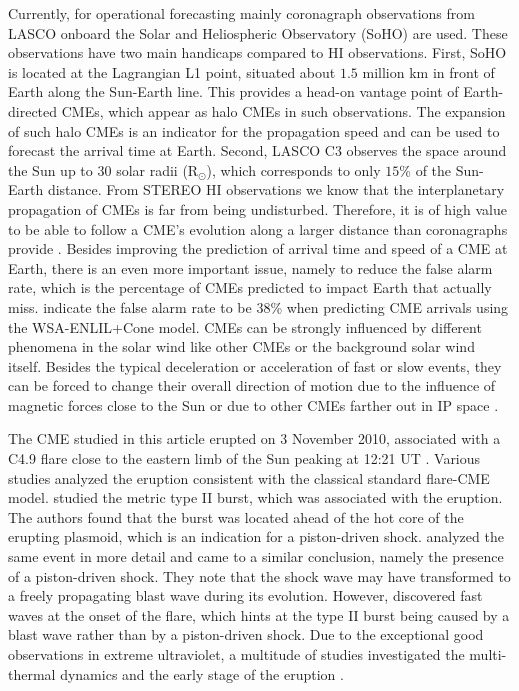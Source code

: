 \documentclass[draft]{agujournal}
\begin{document}
Currently, for operational forecasting mainly coronagraph observations from LASCO onboard the Solar and Heliospheric Observatory (SoHO) are used. These observations have two main handicaps compared to HI observations. First, SoHO is located at the Lagrangian L1 point, situated about $1.5$ million km in front of Earth along the Sun-Earth line. This provides a head-on vantage point of Earth-directed CMEs, which appear as halo CMEs in such observations. The expansion of such halo CMEs is an indicator for the propagation speed \citep[][]{schw05} and can be used to forecast the arrival time at Earth. Second, LASCO C3 observes the space around the Sun up to $30$ solar radii (R$_\odot$), which corresponds to only $15$\% of the Sun-Earth distance. From STEREO HI observations we know that the interplanetary propagation of CMEs is far from being undisturbed. Therefore, it is of high value to be able to follow a CME's evolution along a larger distance than coronagraphs provide \citep[e.g.][]{col13}. 
Besides improving the prediction of arrival time and speed of a CME at Earth, there is an even more important issue, namely to reduce the false alarm rate, which is the percentage of CMEs predicted to impact Earth that actually miss. \citet{may15} indicate the false alarm rate to be $38$\% when predicting CME arrivals using the WSA-ENLIL+Cone model.
CMEs can be strongly influenced by different phenomena in the solar wind like other CMEs or the background solar wind itself. Besides the typical deceleration or acceleration of fast or slow events, they can be forced to change their overall direction of motion due to the influence of magnetic forces close to the Sun \citep[][]{kayoph15,moe15} or due to other CMEs farther out in IP space \citep[e.g.][]{lug12}.

The CME studied in this article erupted on 3 November 2010, associated with a C4.9 flare close to the eastern limb of the Sun peaking at 12:21 UT \citep[][]{ree11}. Various studies analyzed the eruption consistent with the classical standard flare-CME model. 
\citet[][]{bai12} studied the metric type \textrm{II} burst, which was associated with the eruption. The authors found that the burst was located ahead of the hot core of the erupting plasmoid, which is an indication for a piston-driven shock. \citet[][]{zim12} analyzed the same event in more detail and came to a similar conclusion, namely the presence of a piston-driven shock. They note that the shock wave may have transformed to a freely propagating blast wave during its evolution. However, \citet{kuminn13} discovered fast waves at the onset of the flare, which hints at the type \textrm{II} burst being caused by a blast wave rather than by a piston-driven shock. Due to the exceptional good observations in extreme ultraviolet, a multitude of studies investigated the multi-thermal dynamics and the early stage of the eruption \citep[e.g.][]{chen11,fou11,hankon13}.
\end{document}
